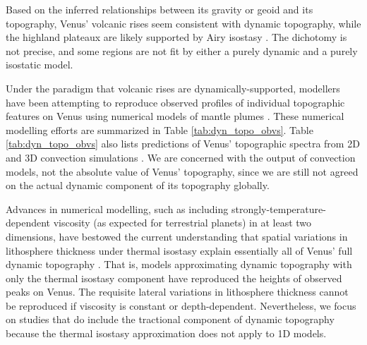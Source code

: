 Based on the inferred relationships between its gravity or geoid and its topography, Venus' volcanic rises seem consistent with dynamic topography, while the highland plateaux are likely supported by Airy isostasy \citep{Kiefer1986, Grimm1991, Kiefer1991, Smrekar1994, McKenzie1994, Kucinskas1994, Smrekar1996, Nimmo1996, Simons1997, Pauer2006, James2013, Yang2016}. The dichotomy is not precise, and some regions are not fit by either a purely dynamic and a purely isostatic model. 

Under the paradigm that volcanic rises are dynamically-supported, modellers have been attempting to reproduce observed profiles of individual topographic features on Venus using numerical models of mantle plumes \citep{Kiefer1991, Kiefer1992, Moresi1995, Nimmo1996, Smrekar1996, Kiefer1998}. These numerical modelling efforts are summarized in Table \ref{tab:dyn_topo_obvs}. Table \ref{tab:dyn_topo_obvs} also lists predictions of Venus' topographic spectra from 2D and 3D convection simulations \citep{Golle2012, Benesova2012, Huang2013, Yang2016}. We are concerned with the output of convection models, not the absolute value of Venus' topography, since we are still not agreed on the actual dynamic component of its topography globally.


Advances in numerical modelling, such as including strongly-temperature-dependent viscosity (as expected for terrestrial planets) in at least two dimensions, have bestowed the current understanding that spatial variations in lithosphere thickness under thermal isostasy explain essentially all of Venus' full dynamic topography \citep{Kucinskas1994, Moore1995, Moore1997, Solomatov1996a, Orth2011}. That is, models approximating dynamic topography with only the thermal isostasy component have reproduced the heights of observed peaks on Venus. The requisite lateral variations in lithosphere thickness cannot be reproduced if viscosity is constant or depth-dependent. Nevertheless, we focus on studies that do include the tractional component of dynamic topography because the thermal isostasy approximation does not apply to 1D models.



